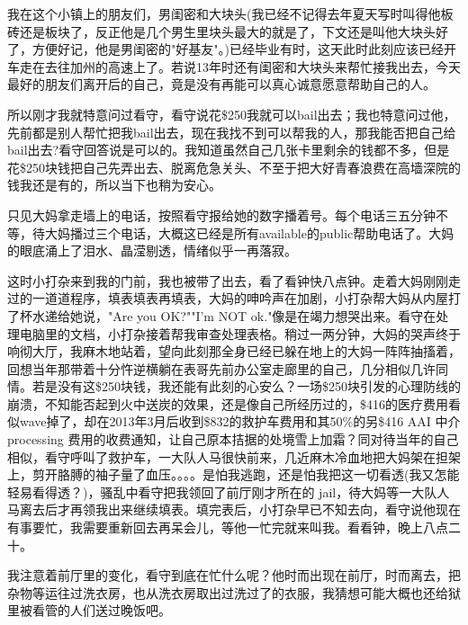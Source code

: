 \documentclass[12pt]{book}
\begin{document}
我在这个小镇上的朋友们，男闺密和大块头(我已经不记得去年夏天写时叫得他板砖还是板块了，反正他是几个男生里块头最大的就是了，下文还是叫他大块头好了，方便好记，他是男闺密的"好基友"。)已经毕业有时，这天此时此刻应该已经开车走在去往加州的高速上了。若说13年时还有闺密和大块头来帮忙接我出去，今天最好的朋友们离开后的自己，竟是没有再能可以真心诚意愿意帮助自己的人。

所以刚才我就特意问过看守，看守说花\$250我就可以bail出去；我也特意问过他，先前都是别人帮忙把我bail出去，现在我找不到可以帮我的人，那我能否把自己给bail出去?看守回答说是可以的。我知道虽然自己几张卡里剩余的钱都不多，但是花\$250块钱把自己先弄出去、脱离危急关头、不至于把大好青春浪费在高墙深院的钱我还是有的，所以当下也稍为安心。

只见大妈拿走墙上的电话，按照看守报给她的数字播着号。每个电话三五分钟不等，待大妈播过三个电话，大概这已经是所有available的public帮助电话了。大妈的眼底涌上了泪水、晶滢剔透，情绪似乎一再落寂。

这时小打杂来到我的门前，我也被带了出去，看了看钟快八点钟。走着大妈刚刚走过的一道道程序，填表填表再填表，大妈的呻吟声在加剧，小打杂帮大妈从内屋打了杯水递给她说，"Are you OK?""I'm NOT ok."像是在竭力想哭出来。看守在处理电脑里的文档，小打杂接着帮我审查处理表格。稍过一两分钟，大妈的哭声终于响彻大厅，我麻木地站着，望向此刻那全身已经已躲在地上的大妈一阵阵抽搐着，回想当年那带着十分忤逆横躺在表哥先前办公室走廊里的自己，几分相似几许同情。若是没有这\$250块钱，我还能有此刻的心安么？一场\$250块引发的心理防线的崩溃，不知能否起到火中送炭的效果，还是像自己所经历过的，\$416的医疗费用看似wave掉了，却在2013年3月后收到\$832的救护车费用和其50\%的另\$416 AAI 中介processing 费用的收费通知，让自己原本拮据的处境雪上加霜？同对待当年的自己相似，看守呼叫了救护车，一大队人马很快前来，几近麻木冷血地把大妈架在担架上，剪开胳膊的袖子量了血压。。。。是怕我逃跑，还是怕我把这一切看透(我又怎能轻易看得透？)，骚乱中看守把我领回了前厅刚才所在的 jail，待大妈等一大队人马离去后才再领我出来继续填表。填完表后，小打杂早已不知去向，看守说他现在有事要忙，我需要重新回去再呆会儿，等他一忙完就来叫我。看看钟，晚上八点二十。 

我注意着前厅里的变化，看守到底在忙什么呢？他时而出现在前厅，时而离去，把杂物等运往过洗衣房，也从洗衣房取出过洗过了的衣服，我猜想可能大概也还给狱里被看管的人们送过晚饭吧。
\end{document}
